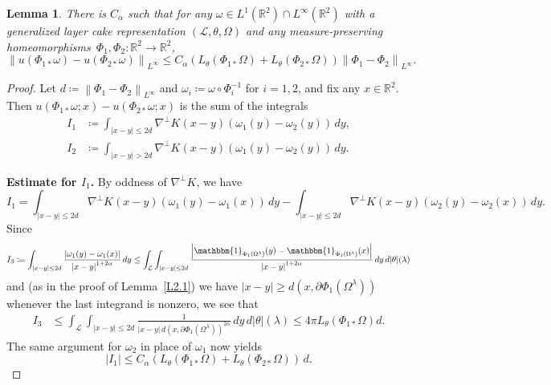 \documentclass[reqno,centertags,12pt]{amsart}
\newtheorem{lemma}[theorem]{Lemma}
\theoremstyle{definition}
\numberwithin{equation}{section}
\newcommand{\abs}[1]{\left\lvert#1\right\rvert}
\newcommand{\norm}[1]{\left\|#1\right\|}
\newcommand{\bbR}{{\mathbb{R}}}
\newcommand{\tht}{\theta}
\begin{document}
\begin{lemma}\label{L2.2}
    There is $C_{\alpha}$ such that for any
    $\omega\in L^{1}(\bbR^{2})\cap L^{\infty}(\bbR^{2})$
    with a generalized layer cake representation $(\mathcal{L},\theta,\Omega)$ and any
    measure-preserving homeomorphisms\ $\Phi_{1},\Phi_{2}\colon\bbR^{2}\to\bbR^{2}$,
    \[
        \norm{u(\Phi_{1*}\omega) - u(\Phi_{2*}\omega)}_{L^{\infty}} \leq
        C_{\alpha} \left(L_{\tht}(\Phi_{1*}\Omega) + L_{\tht}(\Phi_{2*}\Omega)\right)
        \norm{\Phi_{1} - \Phi_{2}}_{L^{\infty}}.
    \]
\end{lemma}

\begin{proof}
    Let $d\coloneqq\norm{\Phi_{1} - \Phi_{2}}_{L^{\infty}}$ and
    $\omega_{i}\coloneqq \omega\circ\Phi_{i}^{-1}$ for $i=1,2$, and fix any $x\in\bbR^{2}$.  Then $u(\Phi_{1*}\omega;x) - u(\Phi_{2*}\omega;x)$ is the sum of the integrals
    \begin{align*}
        I_{1} &\coloneqq \int_{\abs{x - y}\leq 2d}
        \nabla^{\perp}K(x - y)(\omega_{1}(y) - \omega_{2}(y))\,dy, \\
        I_{2} &\coloneqq \int_{\abs{x - y} > 2d}
        \nabla^{\perp}K(x - y)(\omega_{1}(y) - \omega_{2}(y))\,dy.
    \end{align*}

    \textbf{Estimate for $I_{1}$.} By oddness of $\nabla^{\perp}K$, we have
    \[
        I_{1} = \int_{\abs{x - y}\leq 2d}\nabla^{\perp}K(x - y)
        (\omega_{1}(y) - \omega_{1}(x))\,dy
        - \int_{\abs{x - y}\leq 2d}\nabla^{\perp}K(x - y)
        (\omega_{2}(y) - \omega_{2}(x))\,dy.
    \]
Since
    \[
        I_{3} \coloneqq \int_{\abs{x - y} \leq 2d}
        \frac{\abs{\omega_{1}(y) - \omega_{1}(x)}}{\abs{x - y}^{1 + 2\alpha}}\,dy
        \leq \int_{\mathcal{L}}\int_{\abs{x - y}\leq 2d}
        \frac{\abs{\mathbbm{1}_{\Phi_{1}(\Omega^{\lambda})}(y)
        - \mathbbm{1}_{\Phi_{1}(\Omega^{\lambda})}(x)}}
        {\abs{x - y}^{1+2\alpha}}\,dy\,d|\theta|(\lambda)
    \]
    and (as in the proof of Lemma~\ref{L2.1})
    we have $\abs{x - y} \geq d(x,\partial\Phi_{1}(\Omega^{\lambda}))$
    whenever the  last integrand  is nonzero,
    we see that
    \begin{align*}
        I_{3} &\leq \int_{\mathcal{L}}\int_{\abs{x - y}\leq 2d}
        \frac{1}{\abs{x - y}\, d(x,\partial\Phi_{1}(\Omega^{\lambda}))^{2\alpha}}
        \,dy\,d|\theta|(\lambda)
        \leq 4\pi L_{\tht}(\Phi_{1*}\Omega)d.
    \end{align*}
    The same argument for $\omega_{2}$ in place of $\omega_{1}$ now yields
    \begin{equation} \label{2.100}
        \abs{I_{1}}\leq C_{\alpha}(L_{\tht}(\Phi_{1*}\Omega) + L_{\tht}(\Phi_{2*}\Omega))\, d.
    \end{equation}


\end{proof}
\end{document}
